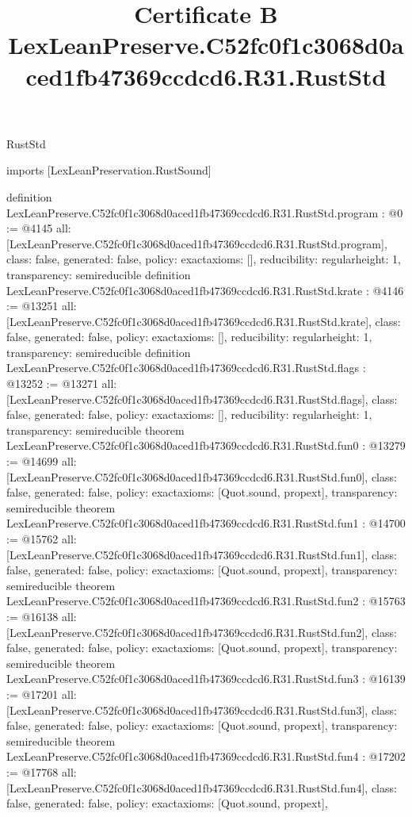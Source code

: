 \begin{lexlean}{RustStd}
\title{Certificate B LexLeanPreserve.C52fc0f1c3068d0aced1fb47369ccdcd6.R31.RustStd}
\begin{coremodule}
imports [LexLeanPreservation.RustSound]

definition LexLeanPreserve.C52fc0f1c3068d0aced1fb47369ccdcd6.R31.RustStd.program : @0 := @4145 {
  all: [LexLeanPreserve.C52fc0f1c3068d0aced1fb47369ccdcd6.R31.RustStd.program],
  class: false,
  generated: false,
  policy: exact{axioms: []},
  reducibility: regular{height: 1},
  transparency: semireducible
}
definition LexLeanPreserve.C52fc0f1c3068d0aced1fb47369ccdcd6.R31.RustStd.krate : @4146 := @13251 {
  all: [LexLeanPreserve.C52fc0f1c3068d0aced1fb47369ccdcd6.R31.RustStd.krate],
  class: false,
  generated: false,
  policy: exact{axioms: []},
  reducibility: regular{height: 1},
  transparency: semireducible
}
definition LexLeanPreserve.C52fc0f1c3068d0aced1fb47369ccdcd6.R31.RustStd.flags : @13252 := @13271 {
  all: [LexLeanPreserve.C52fc0f1c3068d0aced1fb47369ccdcd6.R31.RustStd.flags],
  class: false,
  generated: false,
  policy: exact{axioms: []},
  reducibility: regular{height: 1},
  transparency: semireducible
}
theorem LexLeanPreserve.C52fc0f1c3068d0aced1fb47369ccdcd6.R31.RustStd.fun0 : @13279 := @14699 {
  all: [LexLeanPreserve.C52fc0f1c3068d0aced1fb47369ccdcd6.R31.RustStd.fun0],
  class: false,
  generated: false,
  policy: exact{axioms: [Quot.sound, propext]},
  transparency: semireducible
}
theorem LexLeanPreserve.C52fc0f1c3068d0aced1fb47369ccdcd6.R31.RustStd.fun1 : @14700 := @15762 {
  all: [LexLeanPreserve.C52fc0f1c3068d0aced1fb47369ccdcd6.R31.RustStd.fun1],
  class: false,
  generated: false,
  policy: exact{axioms: [Quot.sound, propext]},
  transparency: semireducible
}
theorem LexLeanPreserve.C52fc0f1c3068d0aced1fb47369ccdcd6.R31.RustStd.fun2 : @15763 := @16138 {
  all: [LexLeanPreserve.C52fc0f1c3068d0aced1fb47369ccdcd6.R31.RustStd.fun2],
  class: false,
  generated: false,
  policy: exact{axioms: [Quot.sound, propext]},
  transparency: semireducible
}
theorem LexLeanPreserve.C52fc0f1c3068d0aced1fb47369ccdcd6.R31.RustStd.fun3 : @16139 := @17201 {
  all: [LexLeanPreserve.C52fc0f1c3068d0aced1fb47369ccdcd6.R31.RustStd.fun3],
  class: false,
  generated: false,
  policy: exact{axioms: [Quot.sound, propext]},
  transparency: semireducible
}
theorem LexLeanPreserve.C52fc0f1c3068d0aced1fb47369ccdcd6.R31.RustStd.fun4 : @17202 := @17768 {
  all: [LexLeanPreserve.C52fc0f1c3068d0aced1fb47369ccdcd6.R31.RustStd.fun4],
  class: false,
  generated: false,
  policy: exact{axioms: [Quot.sound, propext]},
}
\end{coremodule}
\end{lexlean}
